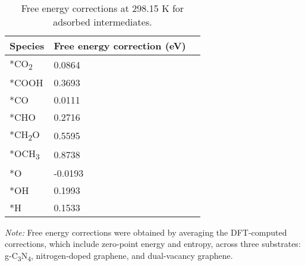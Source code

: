 \begin{table}[htbp]
\label{supp_table3:ads_e_correction}
  \caption{Free energy corrections at 298.15 K for adsorbed intermediates.}
  \centering
  \small
  \begin{tabularx}{0.5\textwidth}{@{}lXr@{}}
    \toprule
    Species                & Free energy correction (eV)  \\
    \midrule
    *CO\textsubscript{2}   &  0.0864                      \\
    *COOH                  &  0.3693                      \\
    *CO                    &  0.0111                      \\
    *CHO                   &  0.2716                      \\
    *CH\textsubscript{2}O  &  0.5595                      \\
    *OCH\textsubscript{3}  &  0.8738                      \\
    *O                     & -0.0193                      \\
    *OH                    &  0.1993                      \\
    *H                     &  0.1533                      \\
    \bottomrule
  \end{tabularx}

  \smallskip

  \begin{flushright}  %
  \begin{minipage}{\textwidth}
    \footnotesize\textit{Note:} {Free energy corrections were obtained by averaging the
      DFT-computed corrections, which include zero-point energy and entropy, across three substrates:
      g-C\textsubscript{3}N\textsubscript{4}, nitrogen-doped graphene, and dual-vacancy graphene.}
  \end{minipage}
  \end{flushright}
\end{table}


